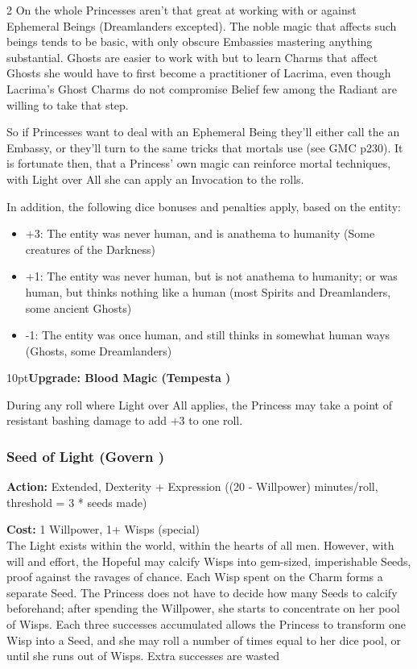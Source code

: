 \begin{multicols}{2}
On the whole Princesses aren't that great at working with or against Ephemeral Beings (Dreamlanders excepted). The noble magic that affects such beings tends to be basic, with only obscure Embassies mastering anything substantial. Ghosts are easier to work with but to learn Charms that affect Ghosts she would have to first become a practitioner of Lacrima, even though Lacrima's Ghost Charms do not compromise Belief few among the Radiant are willing to take that step.

So if Princesses want to deal with an Ephemeral Being they'll either call the an Embassy, or they'll turn to the same tricks that mortals use (see GMC p230). It is fortunate then, that a Princess' own magic can reinforce mortal techniques, with Light over All she can apply an Invocation to the rolls. 

In addition, the following dice bonuses and penalties apply, based on the entity:

\begin{itemize} \item    +3: The entity was never human, and is anathema to humanity (Some creatures of the Darkness)
\item    +1: The entity was never human, but is not anathema to humanity; or was human, but thinks nothing like a human (most Spirits and Dreamlanders, some ancient Ghosts)
\item    -1: The entity was once human, and still thinks in somewhat human ways (Ghosts, some Dreamlanders)
\end{itemize}

\begin{myindentpar}{10pt}\textbf{Upgrade: Blood Magic (Tempesta \textbullet)}

During any roll where Light over All applies, the Princess may take a point of resistant bashing damage to add +3 to one roll.\end{myindentpar}


\subsubsection*{Seed of Light (Govern \textbullet\textbullet)}

\noindent \textbf{Action:} Extended, Dexterity + Expression ((20 - Willpower) minutes/roll, threshold = 3 * seeds made)

\noindent \textbf{Cost:} 1 Willpower, 1+ Wisps (special)\\

\noindent The Light exists within the world, within the hearts of all men. However, with will and effort, the Hopeful may calcify Wisps into gem-sized, imperishable Seeds, proof against the ravages of chance. Each Wisp spent on the Charm forms a separate Seed. The Princess does not have to decide how many Seeds to calcify beforehand; after spending the Willpower, she starts to concentrate on her pool of Wisps. Each three successes accumulated allows the Princess to transform one Wisp into a Seed, and she may roll a number of times equal to her dice pool, or until she runs out of Wisps. Extra successes are wasted


\end{multicols}
